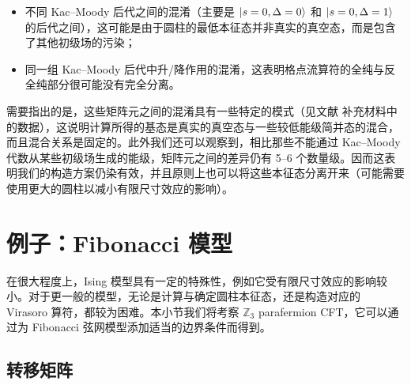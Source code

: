 \begin{itemize}
  \item 不同 Kac--Moody 后代之间的混淆（主要是 $\ket{s=0,\Delta=0}$ 和 $\ket{s=0,\Delta=1}$ 的后代之间），这可能是由于圆柱的最低本征态并非真实的真空态，而是包含了其他初级场的污染；
  \item 同一组 Kac--Moody 后代中升/降作用的混淆，这表明格点流算符的全纯与反全纯部分很可能没有完全分离。
\end{itemize}

需要指出的是，这些矩阵元之间的混淆具有一些特定的模式（见文献 \parencite{wang2022virasoro} 补充材料中的数据），这说明计算所得的基态是真实的真空态与一些较低能级简并态的混合，而且混合关系是固定的。此外我们还可以观察到，相比那些不能通过 Kac--Moody 代数从某些初级场生成的能级，矩阵元之间的差异仍有 5--6 个数量级。因而这表明我们的构造方案仍染有效，并且原则上也可以将这些本征态分离开来（可能需要使用更大的圆柱以减小有限尺寸效应的影响）。

\section{例子：Fibonacci 模型}

在很大程度上，Ising 模型具有一定的特殊性，例如它受有限尺寸效应的影响较小。对于更一般的模型，无论是计算与确定圆柱本征态，还是构造对应的 Virasoro 算符，都较为困难。本小节我们将考察 $\mathbb{Z}_3$ parafermion CFT，它可以通过为 Fibonacci 弦网模型添加适当的边界条件而得到。

\subsection{转移矩阵}

